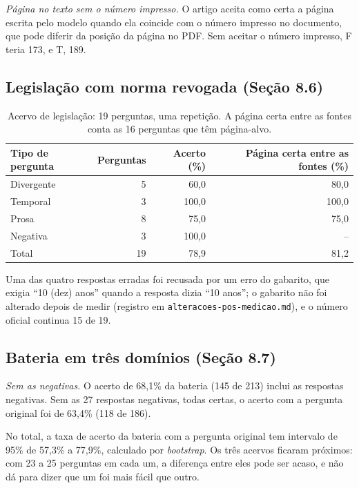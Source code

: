 \documentclass[12pt]{article}
\begin{document}
\textit{Página no texto sem o número impresso.} O artigo aceita como certa a página escrita pelo modelo quando ela coincide com o número impresso no documento, que pode diferir da posição da página no PDF. Sem aceitar o número impresso, F teria 173, e T, 189.

\subsection*{Legislação com norma revogada (Seção 8.6)}

\begin{table}[!htbp]
\centering
\caption{Acervo de legislação: 19 perguntas, uma repetição. A página certa entre as fontes conta as 16 perguntas que têm página-alvo.}
\label{apoio:dominio2}
\begin{tabular}{lrrr}
\toprule
Tipo de pergunta & Perguntas & Acerto (\%) & Página certa entre as fontes (\%) \\
\midrule
Divergente & 5 & 60,0 & 80,0 \\
Temporal   & 3 & 100,0 & 100,0 \\
Prosa      & 8 & 75,0 & 75,0 \\
Negativa   & 3 & 100,0 & --    \\
\midrule
Total      & 19 & 78,9 & 81,2 \\
\bottomrule
\end{tabular}
\end{table}

Uma das quatro respostas erradas foi recusada por um erro do gabarito, que exigia ``10 (dez) anos'' quando a resposta dizia ``10 anos''; o gabarito não foi alterado depois de medir (registro em \texttt{alteracoes-pos-medicao.md}), e o número oficial continua 15 de 19.

\subsection*{Bateria em três domínios (Seção 8.7)}

\textit{Sem as negativas.} O acerto de 68,1\% da bateria (145 de 213) inclui as respostas negativas. Sem as 27 respostas negativas, todas certas, o acerto com a pergunta original foi de 63,4\% (118 de 186).

No total, a taxa de acerto da bateria com a pergunta original tem intervalo de 95\% de 57,3\% a 77,9\%, calculado por \emph{bootstrap}. Os três acervos ficaram próximos: com 23 a 25 perguntas em cada um, a diferença entre eles pode ser acaso, e não dá para dizer que um foi mais fácil que outro.
\end{document}
